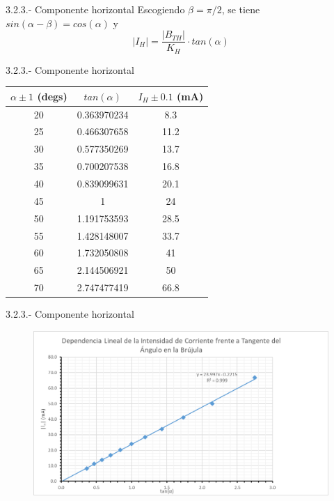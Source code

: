 \documentclass{beamer}
\providecommand{\abs}[1]{\left|#1\right|}
\begin{document}
\begin{frame}{3.2.3.- Componente horizontal}
    Escogiendo $\beta = \pi/2$, se tiene $sin(\alpha - \beta) = cos(\alpha)$ y \pause
    \begin{equation}
        \abs{I_{H}} = \frac{\abs{B_{TH}}}{K_{H}} \cdot tan(\alpha)\nonumber
    \end{equation}
\end{frame}
\begin{frame}{3.2.3.- Componente horizontal}
    \begin{table}[]
\begin{tabular}{|c|c|c|}
\hline
$\alpha \pm 1$ (degs) & $tan(\alpha)$      & $I_{H} \pm 0.1$ (mA) \\ \hline
20        & 0.363970234 & 8.3     \\ \hline
25        & 0.466307658 & 11.2    \\ \hline
30        & 0.577350269 & 13.7    \\ \hline
35        & 0.700207538 & 16.8    \\ \hline
40        & 0.839099631 & 20.1    \\ \hline
45        & 1           & 24      \\ \hline
50        & 1.191753593 & 28.5    \\ \hline
55        & 1.428148007 & 33.7    \\ \hline
60        & 1.732050808 & 41      \\ \hline
65        & 2.144506921 & 50      \\ \hline
70        & 2.747477419 & 66.8    \\ \hline
\end{tabular}
\end{table}
\end{frame}
\begin{frame}{3.2.3.- Componente horizontal}
    \begin{figure}
        \centering
        \includegraphics[scale=0.5]{image3.png}
        \label{fig:my_label}
    \end{figure}
\end{frame}
\end{document}
